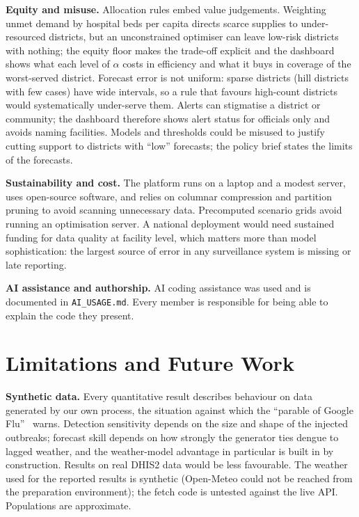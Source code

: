 \documentclass[conference]{IEEEtran}
\begin{document}
\textbf{Equity and misuse.} Allocation rules embed value judgements. Weighting unmet demand by hospital beds per capita directs scarce supplies to under-resourced districts, but an unconstrained optimiser can leave low-risk districts with nothing; the equity floor makes the trade-off explicit and the dashboard shows what each level of $\alpha$ costs in efficiency and what it buys in coverage of the worst-served district. Forecast error is not uniform: sparse districts (hill districts with few cases) have wide intervals, so a rule that favours high-count districts would systematically under-serve them. Alerts can stigmatise a district or community; the dashboard therefore shows alert status for officials only and avoids naming facilities. Models and thresholds could be misused to justify cutting support to districts with ``low'' forecasts; the policy brief states the limits of the forecasts.

\textbf{Sustainability and cost.} The platform runs on a laptop and a modest server, uses open-source software, and relies on columnar compression and partition pruning to avoid scanning unnecessary data. Precomputed scenario grids avoid running an optimisation server. A national deployment would need sustained funding for data quality at facility level, which matters more than model sophistication: the largest source of error in any surveillance system is missing or late reporting.

\textbf{AI assistance and authorship.} AI coding assistance was used and is documented in \texttt{AI\_USAGE.md}. Every member is responsible for being able to explain the code they present.
\section{Limitations and Future Work}\label{sec:limits}
\textbf{Synthetic data.} Every quantitative result describes behaviour on data generated by our own process, the situation against which the ``parable of Google Flu''~\cite{lazer} warns. Detection sensitivity depends on the size and shape of the injected outbreaks; forecast skill depends on how strongly the generator ties dengue to lagged weather, and the weather-model advantage in particular is built in by construction. Results on real DHIS2 data would be less favourable. The weather used for the reported results is synthetic (Open-Meteo could not be reached from the preparation environment); the fetch code is untested against the live API. Populations are approximate.
\end{document}
